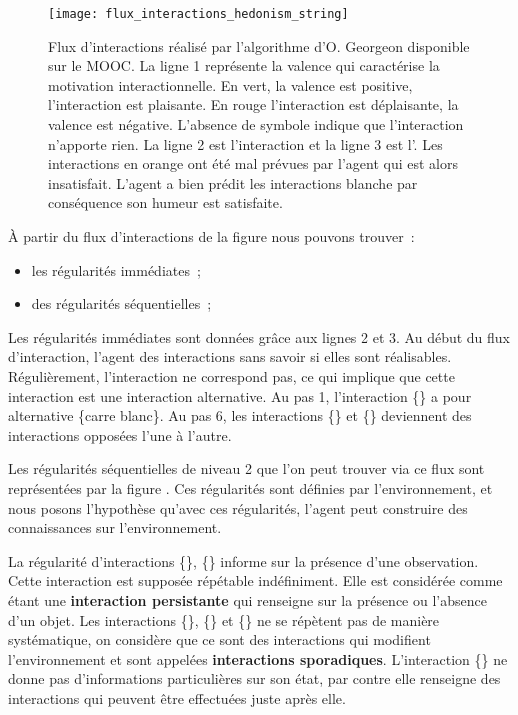 \documentclass{llncs}
\begin{document}
\begin{figure}
	\centering
	\texttt{[image: flux\_interactions\_hedonism\_string]}
	\caption{Flux d'interactions réalisé par l'algorithme d'O. Georgeon disponible sur le MOOC\protect\footnotemark. La ligne \num{1} représente la valence qui caractérise la motivation interactionnelle. En vert, la valence est positive, l'interaction est plaisante. En rouge l'interaction est déplaisante, la valence est négative. L'absence de symbole indique que l'interaction n'apporte rien. La ligne \num{2} est l'interaction \intended et la ligne \num{3} est l'\enacted. Les interactions en orange ont été mal prévues par l'agent qui est alors insatisfait. L'agent a bien prédit les interactions \enacted blanche par conséquence son humeur est satisfaite.}
	\label{fig:interactions_flux_hedonism_string_problem}
\end{figure}
À partir du flux d'interactions de la figure  nous pouvons trouver~:
\begin{itemize}
	\item les régularités immédiates~;
	\item des régularités séquentielles~;
\end{itemize}

Les régularités immédiates sont données grâce aux lignes \num{2 et 3}. Au début du flux d'interaction, l'agent \intend des interactions sans savoir si elles sont réalisables. Régulièrement, l'interaction \enacted ne correspond pas, ce qui implique que cette interaction est une interaction alternative. Au pas 1, l'interaction \{\carreBleu\} a pour alternative \{carre blanc\}. Au pas 6, les interactions \{\carreBleu\} et \{\carreBlanc\} deviennent des interactions opposées l'une à l'autre.

Les régularités séquentielles de niveau 2 que l'on peut trouver via ce flux sont représentées par la figure . Ces régularités sont définies par l'environnement, et nous posons l'hypothèse qu'avec ces régularités, l'agent peut construire des connaissances sur l'environnement. 

La régularité d'interactions \{\carreBlanc\}, \{\carreBlanc\} informe sur la présence d'une observation. Cette interaction est supposée répétable indéfiniment. Elle est considérée comme étant une \textbf{interaction persistante} qui renseigne sur la présence ou l'absence d'un objet. Les interactions \{\rondBleu\}, \{\triangleBlanc\} et \{\triangleBleu\} ne se répètent pas de manière systématique, on considère que ce sont des interactions qui modifient l'environnement et sont appelées \textbf{interactions sporadiques}. L'interaction \{\rondBlanc\} ne donne pas d'informations particulières sur son état, par contre elle renseigne des interactions qui peuvent être effectuées juste après elle.
\end{document}
